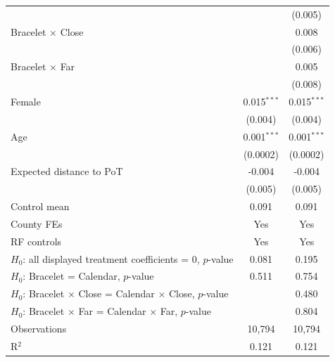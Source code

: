 {\begin{tabular}{lcc}
                                                                         &               & (0.005)\\   
   Bracelet $\times$ Close                                               &               & 0.008\\   
                                                                         &               & (0.006)\\   
   Bracelet $\times$ Far                                                 &               & 0.005\\   
                                                                         &               & (0.008)\\   
   \addlinespace[0.4em]
   Female                                                                & 0.015$^{***}$ & 0.015$^{***}$\\   
                                                                         & (0.004)       & (0.004)\\   
   Age                                                                   & 0.001$^{***}$ & 0.001$^{***}$\\   
                                                                         & (0.0002)      & (0.0002)\\   
   Expected distance to PoT                                              & -0.004        & -0.004\\   
                                                                         & (0.005)       & (0.005)\\   
   Control mean                                                          & 0.091         & 0.091\\  
   County FEs                                                            & Yes           & Yes\\  
   RF controls                                                           & Yes           & Yes\\  
   $H_0$: all displayed treatment coefficients = 0, $p$-value            & 0.081         & 0.195\\  
   $H_0$: Bracelet = Calendar, $p$-value                                 & 0.511         & 0.754\\  
   $H_0$: Bracelet $\times$ Close = Calendar $\times$ Close, $p$-value   &               & 0.480\\  
   $H_0$: Bracelet $\times$ Far = Calendar $\times$ Far, $p$-value       &               & 0.804\\  
   \midrule
   Observations                                                          & 10,794        & 10,794\\  
   R$^2$                                                                 & 0.121         & 0.121\\  
   \midrule \midrule
\end{tabular}}


